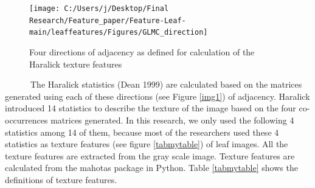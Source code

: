 \documentclass{article}
\begin{document}
\begin{figure}[!ht]

{\centering \texttt{[image: C:/Users/j/Desktop/Final Research/Feature\_paper/Feature-Leaf-main/leaffeatures/Figures/GLMC\_direction]} 

}

\caption{\label{direction}Four directions of adjacency as defined for calculation of the Haralick texture features}\label{fig:unnamed-chunk-24}
\end{figure}

~~~~~~The Haralick statistics (Dean 1999) are calculated based on the
matrices generated using each of these directions (see Figure
\ref{img1}) of adjacency. Haralick introduced 14 statistics to describe
the texture of the image based on the four co-occurrences matrices
generated. In this research, we only used the following 4 statistics
among 14 of them, because most of the researchers used these 4
statistics as texture features (see figure \ref{tabmytable}) of leaf
images. All the texture features are extracted from the gray scale
image. Texture features are calculated from the mahotas package in
Python. Table \ref{tabmytable} shows the definitions of texture
features.
\end{document}
